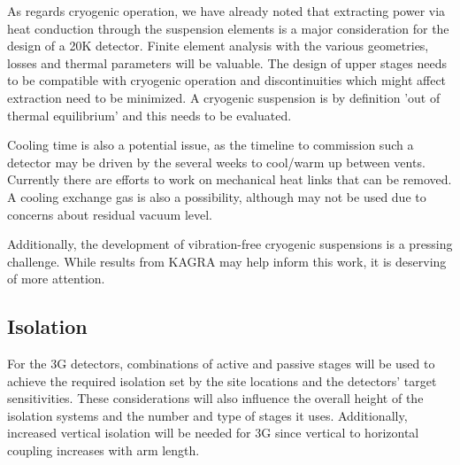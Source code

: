 As regards cryogenic operation, we have already noted that extracting power via heat conduction through the suspension elements is a major consideration for the design of a 20K detector. Finite element analysis with the various geometries, losses and thermal parameters will be valuable. The design of upper stages needs to be compatible with cryogenic operation and discontinuities which might affect extraction need to be minimized. A cryogenic suspension is by definition 'out of thermal equilibrium' and this needs to be evaluated.

Cooling time is also a potential issue, as the timeline to commission such a detector may be driven by the several weeks to cool/warm up between vents. Currently there are efforts to work on mechanical heat links that can be removed. A cooling exchange gas is also a possibility, although may not be used due to concerns about residual vacuum level.

Additionally, the development of vibration-free cryogenic suspensions is a pressing challenge. While results from KAGRA may help inform this work, it is deserving of more attention.

\subsection{Isolation }
For the 3G detectors, combinations of active and passive stages will be used to achieve the required isolation set by the site locations and the detectors' target sensitivities.
These considerations will also influence the overall height of the isolation systems and the number and type of stages it uses.
Additionally, increased vertical isolation will be needed for 3G since vertical to horizontal coupling increases with arm length. 

